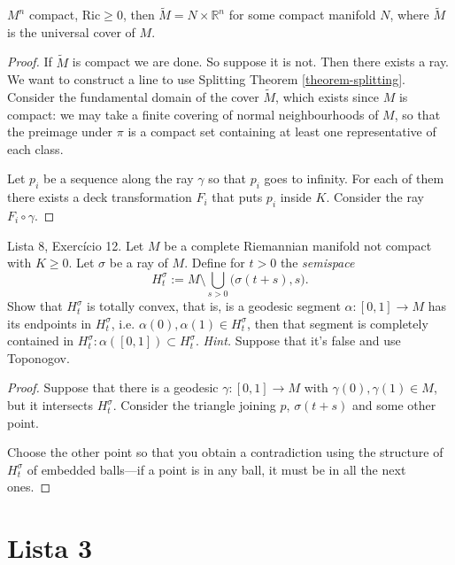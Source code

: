 \begin{exercise}
\label{exercise-product-of-compact-and-Rn}
$M^n$ compact, $\text{Ric} \geq 0$, then $\tilde{M}=N \times \mathbb{R}^n$ for
some compact manifold $N$, where  $\tilde{M}$ is the universal cover of $M$.
\end{exercise}

\begin{proof}
If $\tilde{M}$ is compact we are done. So suppose it is not. Then there exists a
ray. We want to construct a line to use Splitting Theorem \ref{theorem-splitting}.
Consider the fundamental domain of the cover $\tilde{M}$, which exists since
$M$ is compact: we may take a finite covering of normal neighbourhoods of $M$,
so that the preimage under $\pi$ is a compact set containing at least one
representative of each class.

Let $p_i$ be a sequence along the ray $\gamma$ so that $p_i$ goes to infinity.
For each of them there exists a deck transformation $F_i$ that puts $p_i$ inside
$K$. Consider the ray $F_i \circ \gamma$.
\end{proof}

\begin{exercise}
\label{exercise-rays-semispaces}
Lista 8, Exercício 12. Let $M$ be a complete Riemannian manifold not compact
with $K \geq 0$. Let $\sigma$ be a ray of $M$. Define for $t>0$ the {\it
semispace}
$$
H_t^{\sigma}:=M\setminus \bigcup_{s>0}\Big(\sigma(t+s),s).
$$
Show that $H_t^{\sigma}$ is totally convex, that is, is a geodesic segment 
 $\alpha:[0,1]\to M$ has its endpoints in $H_t^{\sigma}$, i.e.
$\alpha(0),\alpha(1) \in H_t^{\sigma}$, then that segment is completely
contained in $H_t^{\sigma}:\alpha([0,1]) \subset H_t^{\sigma}$. {\it Hint.}
Suppose that it's false and use Toponogov.
\end{exercise}

\begin{proof}
Suppose that there is a geodesic $\gamma:[0,1]\to M$ with $\gamma(0),\gamma(1)
\in M$, but it intersects $H_t^{\sigma}$. Consider the triangle joining $p$,
$\sigma(t+s)$ and some other point.

Choose the other point so that you obtain a contradiction using the structure of
$H_t^{\sigma}$ of embedded balls---if a point is in any ball, it must be in all
the next ones.
\end{proof}

\section{Lista 3}
\label{section-lista-3}

